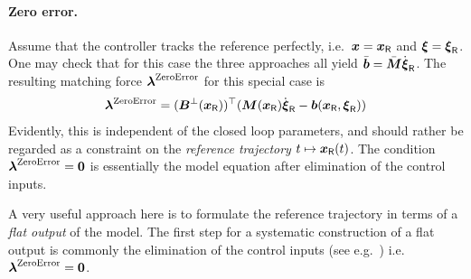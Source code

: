 \paragraph{Zero error.}
Assume that the controller tracks the reference perfectly, i.e.\ $\boldsymbol{x} = \boldsymbol{x}_{\mathsf{R}}$ and $\boldsymbol{\xi}=\boldsymbol{\xi}_{\mathsf{R}}$.
One may check that for this case the three approaches all yield $\bar{\boldsymbol{b}} = \bar{\boldsymbol{M}}\dot{\boldsymbol{\xi}}_{\mathsf{R}}$.
The resulting matching force $\boldsymbol{\lambda}^{\text{ZeroError}}$ for this special case is
\begin{align}\label{eq:MatchingForceZeroError}
 \boldsymbol{\lambda}^{\text{ZeroError}} = (\boldsymbol{B}^\bot(\boldsymbol{x}_{\mathsf{R}}))^\top (\boldsymbol{M}(\boldsymbol{x}_{\mathsf{R}}) \dot{\boldsymbol{\xi}}_{\mathsf{R}} - \boldsymbol{b}(\boldsymbol{x}_{\mathsf{R}}, \boldsymbol{\xi}_{\mathsf{R}}))
\end{align}
Evidently, this is independent of the closed loop parameters, and should rather be regarded as a constraint on the \textit{reference trajectory} $t\mapsto \boldsymbol{x}_{\mathsf{R}}(t)$.
The condition $\boldsymbol{\lambda}^{\text{ZeroError}}=\boldsymbol{0}$ is essentially the model equation after elimination of the control inputs.

A very useful approach here is to formulate the reference trajectory in terms of a \textit{flat output} \cite{Fliess:Flatness} of the model.
The first step for a systematic construction of a flat output is commonly the elimination of the control inputs (see e.g.\ \cite{Schlacher:ConstructionOfFlatOutputs}) i.e.\ $\boldsymbol{\lambda}^{\text{ZeroError}}=\boldsymbol{0}$.

